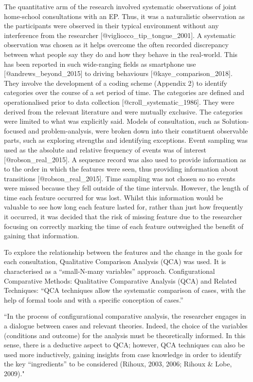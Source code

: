 \documentclass[
]{article}
\begin{document}
The quantitative arm of the research involved systematic observations of
joint home-school consultations with an EP. Thus, it was a naturalistic
observation as the participants were observed in their typical
environment without any interference from the researcher
{[}@vigliocco\_tip\_tongue\_2001{]}. A systematic observation was chosen
as it helps overcome the often recorded discrepancy between what people
say they do and how they behave in the real-world. This has been
reported in such wide-ranging fields as smartphone use
{[}@andrews\_beyond\_2015{]} to driving behaviours
{[}@kaye\_comparison\_2018{]}. They involve the development of a coding
scheme (Appendix 2) to identify categories over the course of a set
period of time. The categories are defined and operationalised prior to
data collection {[}@croll\_systematic\_1986{]}. They were derived from
the relevant literature and were mutually exclusive. The categories were
limited to what was explicitly said. Models of consultation, such as
Solution-focused and problem-analysis, were broken down into their
constituent observable parts, such as exploring strengths and
identifying exceptions. Event sampling was used as the absolute and
relative frequency of events was of interest {[}@robson\_real\_2015{]}.
A sequence record was also used to provide information as to the order
in which the features were seen, thus providing information about
transitions {[}@robson\_real\_2015{]}. Time sampling was not chosen so
no events were missed because they fell outside of the time intervals.
However, the length of time each feature occurred for was lost. Whilst
this information would be valuable to see how long each feature lasted
for, rather than just how frequently it occurred, it was decided that
the risk of missing feature due to the researcher focusing on correctly
marking the time of each feature outweighed the benefit of gaining that
information.

To explore the relationship between the features and the change in the
goals for each consultation, Qualitative Comparison Analysis (QCA) was
used. It is characterised as a ``small-N-many variables'' approach.
Configurational Comparative Methods: Qualitative Comparative Analysis
(QCA) and Related Techniques: ``QCA techniques allow the systematic
comparison of cases, with the help of formal tools and with a specific
conception of cases.''

``In the process of configurational comparative analysis, the researcher
engages in a dialogue between cases and relevant theories. Indeed, the
choice of the variables (conditions and outcome) for the analysis must
be theoretically informed. In this sense, there is a deductive aspect to
QCA; however, QCA techniques can also be used more inductively, gaining
insights from case knowledge in order to identify the key
``ingredients'' to be considered (Rihoux, 2003, 2006; Rihoux \& Lobe,
2009)."
\end{document}
